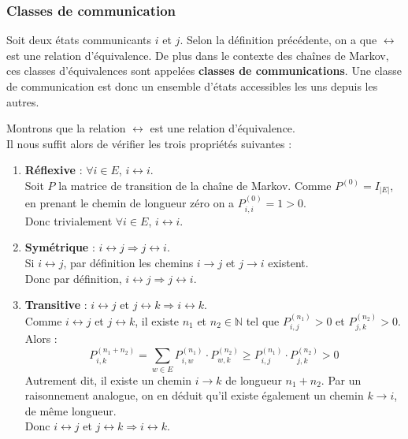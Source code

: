 \documentclass{article}
\begin{document}
\subsubsection{Classes de communication}

\begin{tcolorbox}[colback=white,colframe=red!80!black,title=Classe de communication]
Soit deux états communicants $i$ et $j$. Selon la définition précédente, on a que $\leftrightarrow$ est une relation d'équivalence. De plus dans le contexte des chaînes de Markov, ces classes d'équivalences sont appelées \textbf{classes de communications}.
Une classe de communication est donc un ensemble d'états accessibles les uns depuis les autres.
\end{tcolorbox}

\begin{tcolorbox}[colback=white,colframe=green!80!black,title=Démonstration, breakable]
Montrons que la relation $\leftrightarrow$ est une relation d'équivalence. \\

Il nous suffit alors de vérifier les trois propriétés suivantes :
\begin{enumerate}
    \item \textbf{Réflexive} : $\forall i \in E$, $i \leftrightarrow i$. \\
        Soit $P$ la matrice de transition de la chaîne de Markov.
        Comme $P^{(0)} = I_{|E|}$, en prenant le chemin de longueur zéro on a $P_{i,i}^{(0)} = 1 > 0$. \\
        Donc trivialement $\forall i \in E$, $i \leftrightarrow i$.
    \item \textbf{Symétrique} : $i \leftrightarrow j \Rightarrow j \leftrightarrow i$. \\
        Si $i \leftrightarrow j$, par définition les chemins $i \to j$ et $j \to i$ existent. \\
        Donc par définition, $i \leftrightarrow j \Rightarrow j \leftrightarrow i$.
\newpage %
    \item \textbf{Transitive} : $i \leftrightarrow j$ et $j \leftrightarrow k \Rightarrow i \leftrightarrow k$. \\
        Comme $i \leftrightarrow j$ et $j \leftrightarrow k$, il existe $n_1$ et $n_2 \in \mathbb{N}$ tel que $P_{i,j}^{(n_1)} > 0$ et $P_{j,k}^{(n_2)} > 0$. Alors :
        \[
        P_{i,k}^{(n_1+n_2)} = \sum_{w \in E} P_{i,w}^{(n_1)} \cdot P_{w,k}^{(n_2)} \geq P_{i,j}^{(n_1)} \cdot P_{j,k}^{(n_2)} > 0
        \]
        Autrement dit, il existe un chemin $i \to k$ de longueur $n_1+n_2$. Par un raisonnement analogue, on en déduit qu'il existe également un chemin $k \to i$, de même longueur. \\
        Donc $i \leftrightarrow j$ et $j \leftrightarrow k \Rightarrow i \leftrightarrow k$. \\
\end{enumerate}


\end{tcolorbox}
\end{document}
